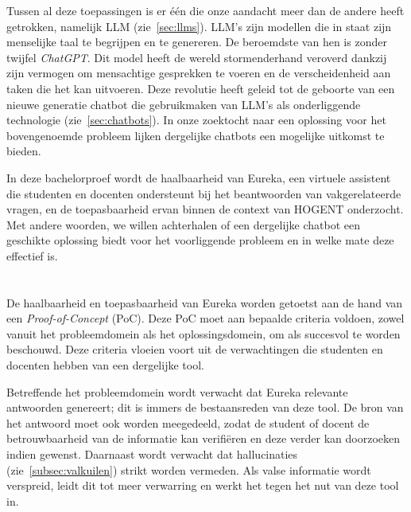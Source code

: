Tussen al deze toepassingen is er één die onze aandacht meer dan de andere heeft getrokken, namelijk \acrfull{LLM} (zie~\ref{sec:llms}). \acrshort{LLM}'s zijn modellen die in staat zijn menselijke taal te begrijpen en te genereren. De beroemdste van hen is zonder twijfel \emph{\gls{ChatGPT}}. Dit model heeft de wereld stormenderhand veroverd dankzij zijn vermogen om mensachtige gesprekken te voeren en de verscheidenheid aan taken die het kan uitvoeren. Deze revolutie heeft geleid tot de geboorte van een nieuwe generatie chatbot die gebruikmaken van \acrshort{LLM}'s als onderliggende technologie (zie~\ref{sec:chatbots}). In onze zoektocht naar een oplossing voor het bovengenoemde probleem lijken dergelijke chatbots een mogelijke uitkomst te bieden.

In deze bachelorproef wordt de haalbaarheid van Eureka, een virtuele assistent die studenten en docenten ondersteunt bij het beantwoorden van vakgerelateerde vragen, en de toepasbaarheid ervan binnen de context van HOGENT onderzocht. Met andere woorden, we willen achterhalen of een dergelijke chatbot een geschikte oplossing biedt voor het voorliggende probleem en in welke mate deze effectief is.
 
\section{}%
\label{sec:onderzoeksdoelstelling}


De haalbaarheid en toepasbaarheid van Eureka worden getoetst aan de hand van een \emph{Proof-of-Concept} (PoC). Deze PoC moet aan bepaalde criteria voldoen, zowel vanuit het probleemdomein als het oplossingsdomein, om als succesvol te worden beschouwd. Deze criteria vloeien voort uit de verwachtingen die studenten en docenten hebben van een dergelijke tool.

Betreffende het probleemdomein wordt verwacht dat Eureka relevante antwoorden genereert; dit is immers de bestaansreden van deze tool. De bron van het antwoord moet ook worden meegedeeld, zodat de student of docent de betrouwbaarheid van de informatie kan verifiëren en deze verder kan doorzoeken indien gewenst. Daarnaast wordt verwacht dat hallucinaties (zie~\ref{subsec:valkuilen}) strikt worden vermeden. Als valse informatie wordt verspreid, leidt dit tot meer verwarring en werkt het tegen het nut van deze tool in.

